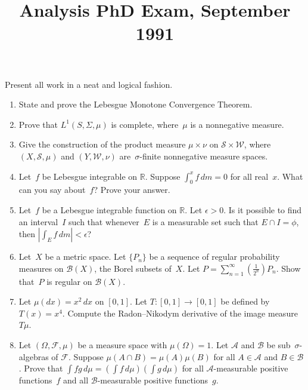 \documentclass[11pt,letterpaper]{article}
\title{Analysis PhD Exam, September 1991}
\author{}
\date{}
\newenvironment{examproblems}[2]{%
  \def\ProblemHeadingTag{#2}%
  \AssignTaggingSocketPlug{block/list/label}{examproblem}%
  \begin{enumerate}%
  \setcounter{enumi}{#1}%
  \renewcommand{\labelenumi}{\textbf{\theenumi.}}%
  \setlength{\topsep}{0.35em}%
  \setlength{\partopsep}{0pt}%
  \setlength{\itemsep}{0.48em}%
  \setlength{\parsep}{0.18em}%
}{\end{enumerate}}
\newenvironment{examinstructions}{%
  \par\begingroup\itshape
}{%
  \par\endgroup\vspace{0.18em}
}
\begin{document}
\maketitle
\thispagestyle{empty}
\begin{examinstructions}
Present all work in a neat and logical fashion.
\end{examinstructions}
\begin{examproblems}{0}{H2}
\def\ProblemHeadingText{Problem 1.}
\item
State and prove the Lebesgue Monotone Convergence Theorem.
\def\ProblemHeadingText{Problem 2.}
\item
Prove that \(L^1(S,\Sigma,\mu)\) is complete, where~\(\mu\) is a nonnegative measure.
\def\ProblemHeadingText{Problem 3.}
\item
Give the construction of the product measure \(\mu\times\nu\) on \(\mathcal S\times\mathcal W\), where \((X,\mathcal S,\mu)\) and \((Y,\mathcal W,\nu)\) are~\(\sigma\)-finite nonnegative measure spaces.
\def\ProblemHeadingText{Problem 4.}
\item
Let~\(f\) be Lebesgue integrable on \(\mathbb R\). Suppose \(\int_0^x f\,dm=0\) for all real~\(x\). What can you say about~\(f\)? Prove your answer.
\def\ProblemHeadingText{Problem 5.}
\item
Let~\(f\) be a Lebesgue integrable function on \(\mathbb R\). Let \(\epsilon>0\). Is it possible to find an interval~\(I\) such that whenever~\(E\) is a measurable set such that \(E\cap I=\phi\), then \(\left|\int_E f\,dm\right|<\epsilon\)?
\def\ProblemHeadingText{Problem 6.}
\item
Let~\(X\) be a metric space. Let \(\{P_n\}\) be a sequence of regular probability measures on \(\mathcal B(X)\), the Borel subsets of~\(X\). Let \(P=\sum_{n=1}^{\infty}\left(\frac{1}{2^n}\right)P_n\). Show that~\(P\) is regular on \(\mathcal B(X)\).
\def\ProblemHeadingText{Problem 7.}
\item
Let \(\mu(dx)=x^2\,dx\) on \([0,1]\). Let \(T:[0,1]\to[0,1]\) be defined by \(T(x)=x^4\). Compute the Radon–Nikodym derivative of the image measure \(T\mu\).
\def\ProblemHeadingText{Problem 8.}
\item
Let \((\Omega,\mathcal F,\mu)\) be a measure space with \(\mu(\Omega)=1\). Let \(\mathcal A\) and \(\mathcal B\) be sub~\(\sigma\)-algebras of \(\mathcal F\). Suppose \(\mu(A\cap B)=\mu(A)\mu(B)\) for all \(A\in\mathcal A\) and \(B\in\mathcal B\). Prove that \(\int fg\,d\mu=\left(\int f\,d\mu\right)\left(\int g\,d\mu\right)\) for all \(\mathcal A\)-measurable positive functions~\(f\) and all \(\mathcal B\)-measurable positive functions~\(g\).
\end{examproblems}
\end{document}
